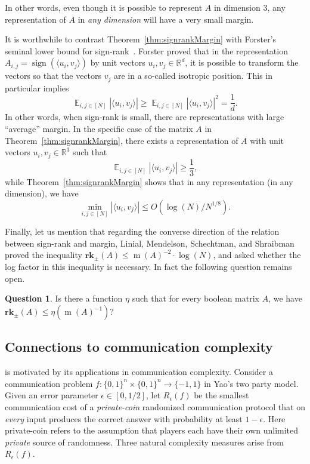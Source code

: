 \documentclass[11pt]{article}
\numberwithin{equation}{section}
\theoremstyle{definition}
\newtheorem{question}[theorem]{Question}
\theoremstyle{plain}
\newcommand{\R}{\mathbb R}
\theoremstyle{definition}\newtheorem{problem}[theorem]{Problem}\theoremstyle{plain}
\DeclareMathOperator{\Ex}{{\mathbb E}}
\DeclareMathOperator{\sign}{sign}
\DeclareMathOperator{\margin}{m}
\newcommand{\srk}{\mathbf{rk}_{\pm}}   %
\begin{document}
In other words, even though it is possible to represent $A$ in dimension $3$, any representation of $A$ in \emph{any dimension} will have a very small margin.

It is worthwhile to contrast Theorem~\ref{thm:signrankMargin} with  Forster's seminal lower bound for sign-rank~\cite{forster2002linear}. Forster proved that in the representation $A_{i,j}=\sign(\langle u_i,v_j \rangle)$ by unit vectors $u_i,v_j \in \R^d$, it is possible to transform the vectors  so that the vectors $v_j$ are in a so-called isotropic position. This in particular implies 
$$\Ex_{i,j \in [N]} |\langle u_i,v_j\rangle| \ge \Ex_{i,j \in [N]} |\langle u_i,v_j\rangle|^2 = \frac{1}{d}.$$
In other words, when sign-rank is small, there are representations with large ``average'' margin. In the specific case of the matrix $A$ in Theorem~\ref{thm:signrankMargin}, there exists a representation of $A$ with unit vectors $u_i,v_j \in \R^3$ such that 
$$\Ex_{i,j \in [N]} |\langle u_i,v_j\rangle| \ge \frac{1}{3},$$
while Theorem~\ref{thm:signrankMargin} shows that in any  representation (in any dimension), we have
$$\min_{i,j \in [N]} |\langle u_i,v_j\rangle| \le O(\log(N)/N^{1/8}).$$

Finally, let us mention that regarding the converse direction of the relation between sign-rank and margin, Linial, Mendelson, Schechtman, and Shraibman~\cite[Corollary 3.2, Lemma 4.2, and Section 8]{MR2359826}  proved the inequality $\srk(A) \le \margin(A)^{-2} \cdot \log(N)$, and asked whether the log factor in this inequality is necessary. In fact the following question remains open. 
\begin{question} 
Is there a function $\eta$ such that for every boolean matrix $A$, we have $\srk(A)\leq \eta(\margin(A)^{-1})$? 
\end{question}





\subsection{Connections to communication complexity}

 is  motivated by its applications in communication complexity.  Consider a communication problem $f:\{0,1\}^n \times \{0,1\}^n \to \{-1,1\}$ in Yao's two party model. Given an error parameter  $\epsilon \in [0,1/2]$, let $R_{\epsilon}(f)$  be the smallest communication cost of a \emph{private-coin} randomized communication protocol that  on \emph{every} input produces the correct answer  with   probability at least  $1-\epsilon$.  Here private-coin refers to the assumption that  players each have their own unlimited \emph{private} source of randomness.   Three natural complexity measures arise from $R_{\epsilon}(f)$.
\end{document}
